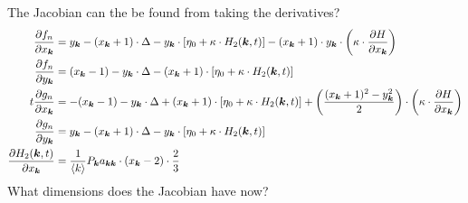 The Jacobian can the be found from taking the derivatives?
\begin{align*}
\frac{\partial f_{n}}{\partial x_{{\boldsymbol{k}}}} &= y_{{\boldsymbol{k}}}-(x_{{\boldsymbol{k}}}+1) \cdot \Delta-y_{{\boldsymbol{k}}} \cdot \left[\eta_{0} + \kappa \cdot H_2({\boldsymbol{k}}, t) \right] - (x_{{\boldsymbol{k}}}+1) \cdot y_{{\boldsymbol{k}}} \cdot \left(\kappa \cdot \frac{\partial H}{\partial x_{{\boldsymbol{k}}}}\right)\\
\frac{\partial f_{n}}{\partial y_{{\boldsymbol{k}}}} &= (x_{{\boldsymbol{k}}}-1)-y_{{\boldsymbol{k}}} \cdot \Delta-(x_{{\boldsymbol{k}}}+1) \cdot \left[\eta_{0} + \kappa \cdot H_2({\boldsymbol{k}}, t) \right] \\t
\frac{\partial g_{n}}{\partial x_{{\boldsymbol{k}}}} &= -(x_{{\boldsymbol{k}}} - 1) - y_{{\boldsymbol{k}}} \cdot \Delta + (x_{{\boldsymbol{k}}} + 1) \cdot \left[\eta_{0} + \kappa \cdot H_2({\boldsymbol{k}}, t) \right] + \left( \frac{(x_{{\boldsymbol{k}}} + 1)^2 - y_{{\boldsymbol{k}}}^2}{2} \right) \cdot \left(\kappa \cdot \frac{\partial H}{\partial x_{{\boldsymbol{k}}}}\right) \\
\frac{\partial g_{n}}{\partial y_{{\boldsymbol{k}}}} &= y_{{\boldsymbol{k}}} - (x_{{\boldsymbol{k}}} + 1)\cdot \Delta - y_{{\boldsymbol{k}}} \cdot \left[\eta_{0} + \kappa \cdot H_2({\boldsymbol{k}}, t) \right] \\
\frac{\partial H_2({\boldsymbol{k}}, t)}{\partial x_{{\boldsymbol{k}}}} &= \frac{1}{\langle k\rangle} P_{{\boldsymbol{k}}} a_{{\boldsymbol{k}} {\boldsymbol{k}}} \cdot(x_{{\boldsymbol{k}}}-2) \cdot \frac{2}{3} 
\end{align*}
What dimensions does the Jacobian have now?


\small{}

\label{LastPage}~


